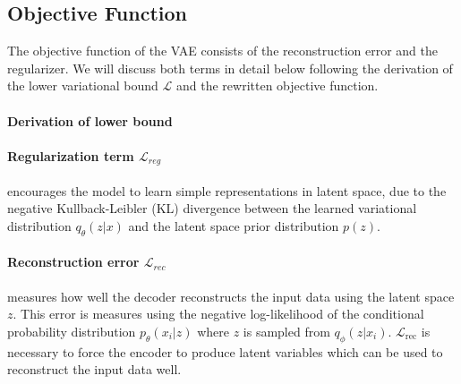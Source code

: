 \subsection{Objective Function}
The objective function of the VAE consists of the reconstruction error and the regularizer.
We will discuss both terms in detail below following the derivation of the lower variational bound $\mathcal{L}$ and the rewritten objective function.

\paragraph{Derivation of lower bound}


\paragraph{Regularization term $\mathcal{L}_{reg}$} encourages the model to learn simple representations in latent space, due to the negative Kullback-Leibler (KL) divergence between the learned variational distribution $q_\theta(z|x)$ and the latent space prior distribution $p(z)$.



\paragraph{Reconstruction error $\mathcal{L}_{rec}$} measures how well the decoder reconstructs the input data using the latent space $z$.
This error is measures using the negative log-likelihood of the conditional probability distribution $p_\theta(x_i|z)$ where $z$ is sampled from $q_\phi(z | x_i)$.
$\mathcal{L}_{\mathrm{rec}}$ is necessary to force the encoder to produce latent variables which can be used to reconstruct the input data well.




